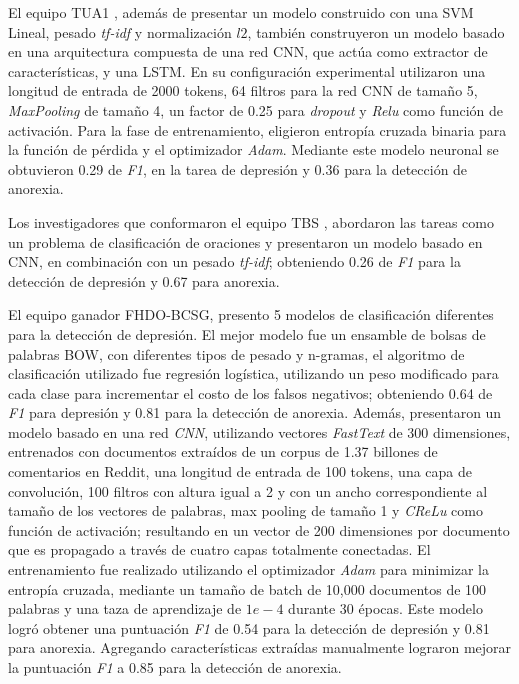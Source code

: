 El equipo TUA1 \citep{liu2018tua1}, además de presentar un modelo construido con una SVM Lineal, pesado \textit{tf-idf} y normalización $l2$, también construyeron un modelo basado en una arquitectura compuesta de una red CNN, que actúa como extractor de características, y una LSTM. En su configuración experimental utilizaron una longitud de entrada de 2000 tokens, 64 filtros para la red CNN de tamaño 5, \textit{MaxPooling} de tamaño 4, un factor de 0.25 para \textit{dropout} y \textit{Relu} como función de activación. Para la fase de entrenamiento, eligieron entropía cruzada binaria para la función de pérdida y el optimizador \textit{Adam}. Mediante este modelo neuronal se obtuvieron 0.29 de \textit{F1}, en la tarea de depresión y 0.36 para la detección de anorexia. 

Los investigadores que conformaron el equipo TBS \citep{wang2018neural}, abordaron las tareas como un problema de clasificación de oraciones y presentaron un modelo basado en CNN, en combinación con un pesado \textit{tf-idf}; obteniendo 0.26 de \textit{F1} para la detección de depresión y 0.67 para anorexia.

El equipo ganador \citep{trotzek2018word} FHDO-BCSG, presento 5 modelos de clasificación diferentes para la detección de depresión. El mejor modelo fue un ensamble de bolsas de palabras BOW, con diferentes tipos de pesado y n-gramas, el algoritmo de clasificación utilizado fue regresión logística, utilizando un peso modificado para cada clase para incrementar el costo de los falsos negativos; obteniendo 0.64 de \textit{F1} para depresión y 0.81 para la detección de anorexia. 
Además, presentaron un modelo basado en una red \textit{CNN}, utilizando vectores \textit{FastText} de 300 dimensiones, entrenados con documentos extraídos de un corpus de 1.37 billones de comentarios en Reddit, una longitud de entrada de 100 tokens, una capa de convolución, 100 filtros con altura igual a 2 y con un ancho correspondiente al tamaño de los vectores de palabras, max pooling de tamaño 1 y \textit{CReLu} como función de activación; resultando en un vector de 200 dimensiones por documento que es propagado a través de cuatro capas totalmente conectadas. El entrenamiento fue realizado utilizando el optimizador \textit{Adam} para minimizar la entropía cruzada, mediante un tamaño de batch de 10,000 documentos de 100 palabras y una taza de aprendizaje de $1e-4$ durante 30 épocas. Este modelo logró obtener una puntuación \textit{F1} de 0.54 para la detección de depresión y 0.81 para anorexia. Agregando características extraídas manualmente lograron mejorar la puntuación \textit{F1} a 0.85 para la detección de anorexia.

